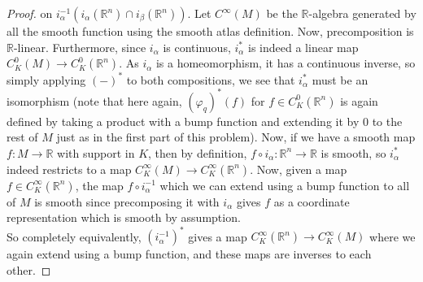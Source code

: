 \documentclass[reqno]{amsart}
\theoremstyle{definition}
\theoremstyle{remark}
\begin{document}
\begin{proof}
        on $i_{\alpha}^{-1} 
        \left( i_{\alpha}(\mathbb{R}^{n}) \cap
        i_{\beta}\left( \mathbb{R}^{n} \right) \right) $.
        Let $C^{\infty}(M)$ be the 
        $\mathbb{R}$-algebra generated by
        all the smooth function using the
        smooth atlas definition.
        Now,
        precomposition is $\mathbb{R}$-linear.
        Furthermore, since $i_{\alpha}$ is continuous,
        $i_{\alpha}^{*}$ is indeed a linear map
        $C_{K}^{0}(M) \to C_{K}^{0}(\mathbb{R}^{n})$.
        As $i_{\alpha}$ is a homeomorphism, it has
        a continuous inverse, so
        simply applying
        $(-)^{*}$ to both compositions, we see
        that $i_{\alpha}^{*}$ must be an isomorphism
        (note that here again, 
        $\left( \varphi_q \right)^{*} (f)$ for
        $f \in C_K^{0}(\mathbb{R}^{n})$ is again
        defined by taking a product with a bump function
        and extending it by $0$ to the rest of
        $M$ just as in the first part of this problem).
        Now, if we
        have a smooth map
        $f \colon M \to \mathbb{R}$ with
        support in $K$, then by definition,
        $f \circ i_{\alpha} \colon
        \mathbb{R}^{n} \to \mathbb{R}$ is smooth, so
        $i_{\alpha}^{*}$ indeed restricts
        to a map
        $C_{K}^{\infty}(M) \to C_{K}^{\infty}(\mathbb{R}^{n})$.
        Now, given a map
        $f \in C_K^{\infty}(\mathbb{R}^{n})$, the
        map
        $f \circ i_{\alpha}^{-1}$ which we
        can extend using a bump function to all
        of $M$ is smooth since precomposing it
         with $i_{\alpha}$ gives $f$ as a coordinate
         representation which is smooth by assumption.\\
        So completely equivalently, 
        $\left( i_{\alpha}^{-1} \right)^{*}$ gives
        a map $C_K^{\infty}(\mathbb{R}^{n}) \to 
        C_K^{\infty}(M)$ where we again extend using a
        bump function, and these
        maps are inverses to each other. 


\end{proof}
\end{document}
